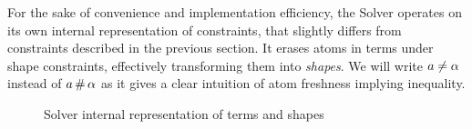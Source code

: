 \documentclass[english, mgr]{iithesis}
\renewcommand{\it}[1]{\textit{#1}}
\begin{document}
For the sake of convenience and implementation efficiency, the Solver operates
on its own internal representation of constraints, that slightly differs from
constraints described in the previous section.
It erases atoms in terms under shape constraints,
effectively transforming them into \it{shapes}.
We will write $a \neq \alpha$ instead of $a \,\#\, \alpha$ as it gives a clear intuition of atom freshness implying inequality.
\begin{figure}[htbp]
  \centering
  \caption{Solver internal representation of terms and shapes}
  \label{fig:solver-internal-representation-terms-shapes}
\end{figure}
\end{document}
